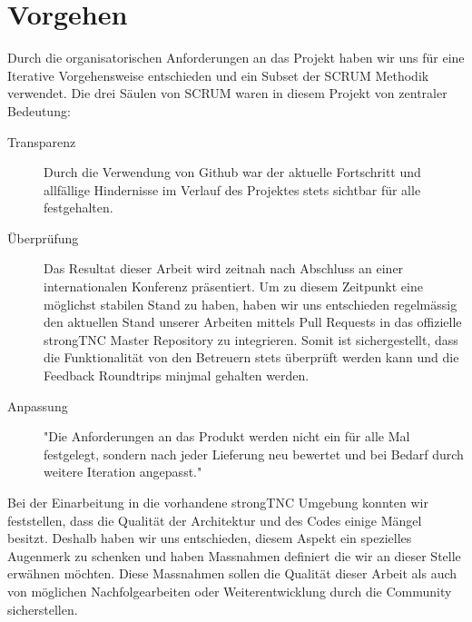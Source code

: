 \chapter{Vorgehen}

Durch die organisatorischen Anforderungen an das Projekt haben wir uns für eine Iterative Vorgehensweise entschieden und ein Subset der SCRUM Methodik verwendet. Die drei Säulen von SCRUM waren in diesem Projekt von zentraler Bedeutung:
\begin{description}
\item[Transparenz]
Durch die Verwendung von Github war der aktuelle Fortschritt und allfällige Hindernisse im Verlauf des Projektes stets sichtbar für alle festgehalten.
\item[Überprüfung]
Das Resultat dieser Arbeit wird zeitnah nach Abschluss an einer internationalen Konferenz präsentiert. Um zu diesem Zeitpunkt eine möglichst stabilen Stand zu haben, haben wir uns entschieden regelmässig den aktuellen Stand unserer Arbeiten mittels Pull Requests in das offizielle strongTNC Master Repository zu integrieren. Somit ist sichergestellt, dass die  Funktionalität von den Betreuern stets überprüft werden kann und die Feedback Roundtrips minjmal gehalten werden.
\item[Anpassung]
"Die Anforderungen an das Produkt werden nicht ein für alle Mal festgelegt, sondern nach jeder Lieferung neu bewertet und bei Bedarf durch weitere Iteration angepasst."

\end{description}
Bei der Einarbeitung in die vorhandene strongTNC Umgebung konnten wir feststellen, dass die Qualität der Architektur und des Codes einige Mängel besitzt. Deshalb haben wir uns entschieden, diesem Aspekt ein spezielles Augenmerk zu schenken und haben Massnahmen definiert die wir an dieser Stelle erwähnen möchten. Diese Massnahmen sollen die Qualität dieser Arbeit als auch von möglichen Nachfolgearbeiten oder Weiterentwicklung durch die Community sicherstellen.

